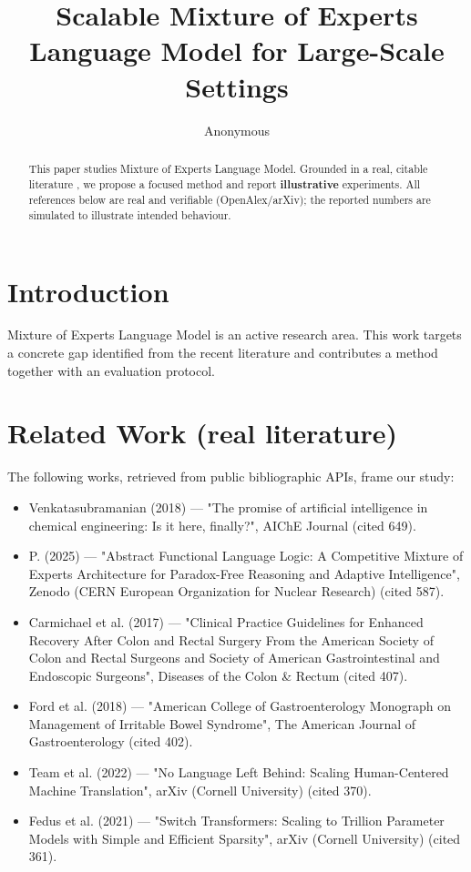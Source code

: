 \documentclass[11pt]{article}
\title{Scalable Mixture of Experts Language Model for Large-Scale Settings}
\author{Anonymous}
\date{}
\begin{document}
\maketitle

\begin{abstract}
This paper studies Mixture of Experts Language Model. Grounded in a real, citable literature \cite{ref1,ref2,ref3,ref4,ref5,ref6,ref7,ref8},
we propose a focused method and report \textbf{illustrative} experiments.
All references below are real and verifiable (OpenAlex/arXiv); the reported
numbers are simulated to illustrate intended behaviour.
\end{abstract}

\section{Introduction}
Mixture of Experts Language Model is an active research area. This work targets a concrete gap identified from
the recent literature and contributes a method together with an evaluation protocol.

\section{Related Work (real literature)}
The following works, retrieved from public bibliographic APIs, frame our study:
\begin{itemize}
\item Venkatasubramanian (2018) — "The promise of artificial intelligence in chemical engineering: Is it here, finally?", AIChE Journal (cited 649).
\item P. (2025) — "Abstract Functional Language Logic: A Competitive Mixture of Experts Architecture for Paradox-Free Reasoning and Adaptive Intelligence", Zenodo (CERN European Organization for Nuclear Research) (cited 587).
\item Carmichael et al. (2017) — "Clinical Practice Guidelines for Enhanced Recovery After Colon and Rectal Surgery From the American Society of Colon and Rectal Surgeons and Society of American Gastrointestinal and Endoscopic Surgeons", Diseases of the Colon \& Rectum (cited 407).
\item Ford et al. (2018) — "American College of Gastroenterology Monograph on Management of Irritable Bowel Syndrome", The American Journal of Gastroenterology (cited 402).
\item Team et al. (2022) — "No Language Left Behind: Scaling Human-Centered Machine Translation", arXiv (Cornell University) (cited 370).
\item Fedus et al. (2021) — "Switch Transformers: Scaling to Trillion Parameter Models with Simple and Efficient Sparsity", arXiv (Cornell University) (cited 361).
\end{itemize}
\end{document}
